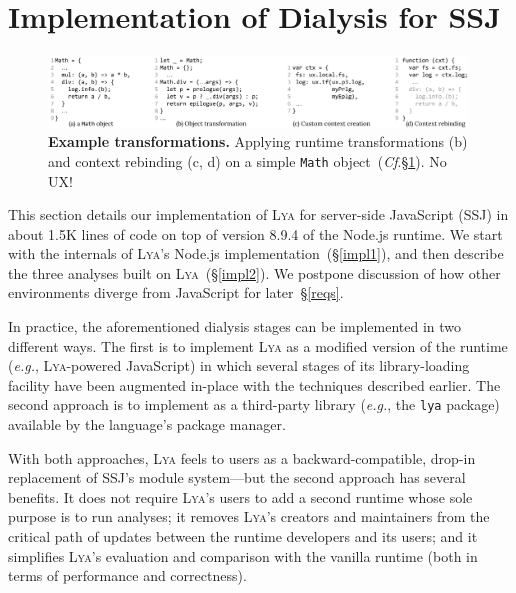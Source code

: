 \documentclass[letterpaper,twocolumn,10pt]{article}
\def\eg{{\em e.g.}, }
\newcommand{\ttt}[1]{\texttt{#1}}
\newcommand{\cf}[1]{(\emph{Cf}.\S\ref{#1})}
\newcommand{\sx}[1]{(\S\ref{#1})}
\newcommand{\sys}{{\scshape Lya}\xspace}
\newcommand{\fixme}[1]{{\color{red}#1}}
\begin{document}
\section{Implementation of Dialysis for SSJ}
\label{impl}

\begin{figure}[t]
\centering
\includegraphics[width=0.99\textwidth]{./figs/lya_ex.pdf}
\vspace{-2mm}
\caption{
  \textbf{Example transformations.}
   Applying runtime transformations (b) and context rebinding (c, d) on a simple \ttt{Math} object~\cf{impl}.
\fixme{No UX!}
}
\label{fig:tx2}
\vspace{-2mm}
\end{figure}


This section details our implementation of \sys for server-side JavaScript (SSJ) in about 1.5K lines of code on top of version 8.9.4 of the Node.js runtime.
We start with the internals of \sys's Node.js implementation~\sx{impl1}, and then describe the three analyses built on \sys~\sx{impl2}.
We postpone discussion of how other environments diverge from JavaScript for later~\S\ref{reqs}.

In practice, the aforementioned dialysis stages can be implemented in two different ways.
The first is to implement \sys as a modified version of the runtime (\eg \sys-powered JavaScript) in which several stages of its library-loading facility have been augmented in-place with the techniques described earlier.
The second approach is to implement as a third-party library (\eg the \ttt{lya} package) available by the language's package manager.

With both approaches, \sys feels to users as a backward-compatible, drop-in replacement of SSJ's module system---but the second approach has several benefits.
It does not require \sys's users to add a second runtime whose sole purpose is to run analyses;
  it removes \sys's creators and maintainers from the critical path of updates between the runtime developers and its users; 
  and it simplifies \sys's evaluation and comparison with the vanilla runtime (both in terms of performance and correctness).
\end{document}
